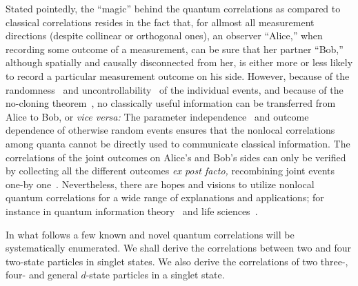 \documentclass[fleqn,twoside]{article}      %
\begin{document}
Stated pointedly, the ``magic'' behind the quantum correlations as compared to classical correlations resides in the fact that,
for allmost all measurement directions (despite collinear or orthogonal ones), an observer ``Alice,''
when recording some outcome of a measurement, can be sure that her partner ``Bob,''
although spatially and causally disconnected from her, is either more or less likely to record a particular measurement outcome on his side.
However, because of the randomness~\cite{svozil-qct} and uncontrollability~\cite{svozil-slash} of the individual events, and
because of the no-cloning theorem~\cite[pp.~39-40]{mermin-07},
no classically useful information can be transferred from Alice to Bob, or {\it vice versa:}
The parameter independence~\cite{clauser,shimony3} and outcome dependence of otherwise random events ensures that
the nonlocal correlations among quanta cannot be directly used to communicate classical information.
The correlations of the joint outcomes on Alice's and Bob's sides can only be  verified by collecting all the different outcomes {\it ex post facto,}
recombining joint events one-by one~\cite{Gill-Larss-04}.
Nevertheless, there are hopes and visions to utilize nonlocal quantum correlations for a wide range of explanations and
applications; for instance in quantum information theory~\cite{bruk-06} and life sciences~\cite{sum-05}.


In what follows a few known and novel quantum correlations will be systematically enumerated.
We shall derive the correlations between two and four two-state particles in singlet states.
We also derive the correlations of two three-, four- and general $d$-state particles in a singlet state.
\end{document}
